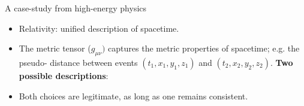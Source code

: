 \documentclass[10pt]{beamer}
\begin{document}
\begin{frame}{A case-study from high-energy physics}
    \begin{itemize}
        \item<1-> Relativity: unified description of spacetime.
        \item<2-> The metric tensor ($g_{\mu\nu})$ captures the metric properties of spacetime; e.g. the pseudo- distance between events $(t_1,x_1,y_1,z_1)$ and $(t_2,x_2,y_2,z_2)$. \textbf{Two possible descriptions}:
    \end{itemize}
    
    \vspace{1em}




    \begin{itemize}
        \item<5-> Both choices are legitimate, as long as one remains consistent.
    \end{itemize}
\end{frame}
\end{document}
